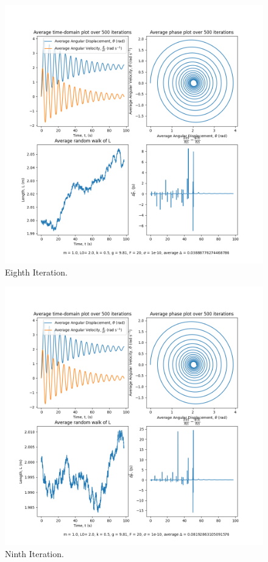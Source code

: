 \documentclass[10pt, twocolumn]{article}
\begin{document}
\begin{figure}[H]
    \centering
    \includegraphics[width = \columnwidth]{Projects/ForcedSimplePendulum/Plots/m = 1.0, L0= 2.0, k = 0.5, g = 9.81, F = 20, sigma = 1e-10, run number 7.png}
    \caption{Eighth Iteration.}
    \label{Eighth Iteration}
\end{figure}

\begin{figure}[H]
    \centering
    \includegraphics[width = \columnwidth]{Projects/ForcedSimplePendulum/Plots/m = 1.0, L0= 2.0, k = 0.5, g = 9.81, F = 20, sigma = 1e-10, run number 8.png}
    \caption{Ninth Iteration.}
    \label{Ninth Iteration}
\end{figure}
\end{document}
